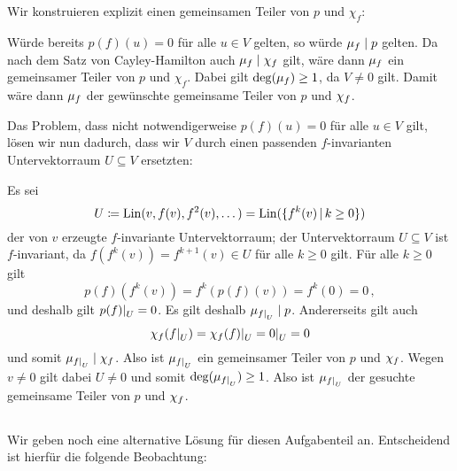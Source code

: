 \section{}





\subsection{}

Wir konstruieren explizit einen gemeinsamen Teiler von $p$ und $\chi_f$:

Würde bereits $p(f)(u) = 0$ für alle $u \in V$ gelten, so würde $\mu_{f} \mathrel{|} p$ gelten.
Da nach dem Satz von Cayley-Hamilton auch $\mu_{f} \mathrel{|} \chi_{f}$ gilt, wäre dann $\mu_{f}$ ein gemeinsamer Teiler von $p$ und $\chi_f$.
Dabei gilt $\deg(\mu_{f}) \geq 1$, da $V \neq 0$ gilt.
Damit wäre dann $\mu_{f}$ der gewünschte gemeinsame Teiler von $p$ und $\chi_{f}$.

Das Problem, dass nicht notwendigerweise $p(f)(u) = 0$ für alle $u \in V$ gilt, lösen wir nun dadurch, dass wir $V$ durch einen passenden $f$-invarianten Untervektorraum $U \subseteq V$ ersetzten:

Es sei
\[
            U
  \defined  \Lin(v, f(v), f^2(v), \dotsc)
  =         \Lin( \{ f^k(v) \suchthat k \geq 0 \} )
\]
der von $v$ erzeugte $f$-invariante Untervektorraum;
der Untervektorraum $U \subseteq V$ ist $f$-invariant, da $f(f^k(v)) = f^{k+1}(v) \in U$ für alle $k \geq 0$ gilt.
Für alle $k \geq 0$ gilt
\[
    p(f)( f^k(v) )
  = f^k( p(f)(v) )
  = f^k( 0 )
  = 0 \,,
\]
und deshalb gilt $\restrict{p(f)}{U} = 0$.
Es gilt deshalb $\minpol{\restrict{f}{U}} \divides p$.
Andererseits gilt auch
\[
    \charpol{f}(\restrict{f}{U})
  = \restrict{\charpol{f}(f)}{U}
  = \restrict{0}{U}
  = 0
\]
und somit $\minpol{\restrict{f}{U}} \divides \charpol{f}$.
Also ist $\minpol{\restrict{f}{U}}$ ein gemeinsamer Teiler von $p$ und $\chi_{f}$.
Wegen $v \neq 0$ gilt dabei $U \neq 0$ und somit $\deg( \minpol{\restrict{f}{U}} ) \geq 1$.
Also ist $\minpol{\restrict{f}{U}}$ der gesuchte gemeinsame Teiler von $p$ und $\chi_{f}$.





\subsection{}

Wir geben noch eine alternative Lösung für diesen Aufgabenteil an.
Entscheidend ist hierfür die folgende Beobachtung:

